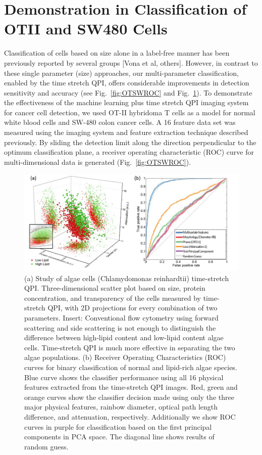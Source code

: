 \documentclass[aps,pra,preprint,superscriptaddress]{revtex4-1}
\begin{document}
\section{Demonstration in Classification of OTII and SW480 Cells}

Classification of cells based on size alone in a label-free manner has been previously reported by several groups [Vona et al, others]. However, in contrast to these single parameter (size) approaches, our multi-parameter classification, enabled by the time stretch QPI, offers considerable improvements in detection sensitivity and accuracy (see Fig.~\ref{fig:OTSWROC} and Fig.~\ref{fig:AlgaeScatter}). To demonstrate the effectiveness of the machine learning plus time stretch QPI imaging system for cancer cell detection, we used OT-II hybridoma T cells as a model for normal white blood cells and SW-480 colon cancer cells. A 16 feature data set was measured using the imaging system and feature extraction technique described previously. By sliding the detection limit along the direction perpendicular to the optimum classification plane, a receiver operating characteristic (ROC) curve for multi-dimensional data is generated (Fig.~\ref{fig:OTSWROC}).

\begin{figure}
\includegraphics[scale=0.5]{FigureAlgaeScatter.jpg}
\caption{\label{fig:AlgaeScatter} (a) Study of algae cells (Chlamydomonas reinhardtii) time-stretch QPI. Three-dimensional scatter plot based on size, protein concentration, and transparency of the cells measured by time-stretch QPI, with 2D projections for every combination of two parameters. Insert: Conventional flow cytometry using forward scattering and side scattering is not enough to distinguish the difference between high-lipid content and low-lipid content algae cells. Time-stretch QPI is much more effective in separating the two algae populations. (b) Receiver Operating Characteristics (ROC) curves for binary classification of normal and lipid-rich algae species. Blue curve shows the classifier performance using all 16 physical features extracted from the time-stretch QPI images. Red, green and orange curves show the classifier decision made using only the three major physical features, rainbow diameter, optical path length difference, and attenuation, respectively. Additionally we show ROC curves in purple for classification based on the first principal components in PCA space. The diagonal line shows results of random guess. }
\end{figure}
\end{document}
